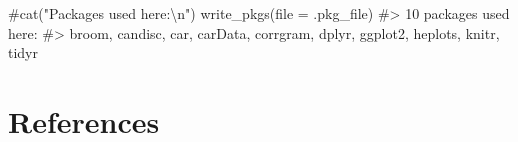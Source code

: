 \documentclass[
  letterpaper,
  10pt,
  krantz2]{krantz}
\makeatletter
\newenvironment{Shaded}{\begin{snugshade}}{\end{snugshade}}
\newcommand{\AttributeTok}[1]{\textcolor[rgb]{0.40,0.45,0.13}{#1}}
\newcommand{\CommentTok}[1]{\textcolor[rgb]{0.37,0.37,0.37}{#1}}
\newcommand{\FunctionTok}[1]{\textcolor[rgb]{0.28,0.35,0.67}{#1}}
\newcommand{\NormalTok}[1]{\textcolor[rgb]{0.00,0.23,0.31}{#1}}
\newenvironment{kframe}{%
  \medskip{}
  \setlength{\fboxsep}{.8em}
  \def\at@end@of@kframe{}%
  \ifinner\ifhmode%
  \def\at@end@of@kframe{\end{minipage}}%
  \begin{minipage}{\columnwidth}%
  \fi\fi%
  \def\FrameCommand##1{\hskip\@totalleftmargin \hskip-\fboxsep
  \colorbox{shadecolor}{##1}\hskip-\fboxsep
      \hskip-\linewidth \hskip-\@totalleftmargin \hskip\columnwidth}%
  \MakeFramed {\advance\hsize-\width
    \@totalleftmargin\z@ \linewidth\hsize
    \@setminipage}}%
{\par\unskip\endMakeFramed%
  \at@end@of@kframe}
\renewenvironment{Shaded}{\begin{kframe}}{\end{kframe}}
\makeatother
\begin{document}
\begin{Shaded}
\begin{Highlighting}[]
\CommentTok{\#cat("Packages used here:\textbackslash{}n")}
\FunctionTok{write\_pkgs}\NormalTok{(}\AttributeTok{file =}\NormalTok{ .pkg\_file)}
\CommentTok{\#\textgreater{} 10  packages used here:}
\CommentTok{\#\textgreater{}  broom, candisc, car, carData, corrgram, dplyr, ggplot2, heplots, knitr, tidyr}
\end{Highlighting}
\end{Shaded}


\chapter*{References}\label{references}

\end{document}
